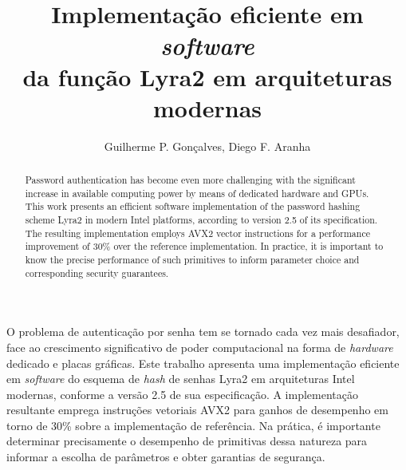 \documentclass{article}
\begin{document}
\title{Implementação eficiente em \emph{software}\\ da função Lyra2 em arquiteturas modernas}

\author{Guilherme P. Gonçalves, Diego F. Aranha}

\address{Laboratório de Segurança e Criptografia (LASCA)\\
	Instituto de Computação (IC) -- Universidade Estadual de Campinas (Unicamp)\\
	Av. Albert Einstein, 1251 -- Campinas/SP -- Brasil\vspace{-0.25cm}
	\vspace{-0.25cm}
}

\maketitle

\begin{abstract}
Password authentication has become even more challenging with the significant increase
in available computing power by means of dedicated hardware and GPUs. This work
presents an efficient software implementation of the password hashing scheme Lyra2 in modern Intel platforms,
according to version 2.5 of its specification. The resulting implementation employs
AVX2 vector instructions for a performance improvement of 30\% over the reference
implementation. In practice, it is important to know the precise performance of such primitives to inform
parameter choice and corresponding security guarantees.
\vspace{-0.25cm}
\end{abstract}

\begin{resumo}
O problema de autenticação por senha tem se tornado cada vez mais desafiador, face ao crescimento
significativo de poder computacional na forma de \emph{hardware} dedicado e placas gráficas.
Este trabalho apresenta uma implementação eficiente em \emph{software} do esquema de \emph{hash} de senhas Lyra2 em arquiteturas Intel modernas,
conforme a versão 2.5 de sua especificação. A implementação resultante emprega instruções vetoriais AVX2
para ganhos de desempenho em torno de 30\% sobre a implementação de referência. Na prática, é importante
determinar precisamente o desempenho de primitivas dessa natureza para informar a escolha de parâmetros
e obter garantias de segurança.\vspace{-0.1cm}
\end{resumo}
\end{document}
